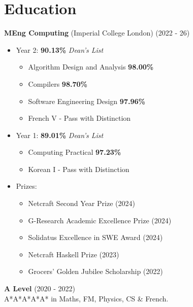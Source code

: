 \documentclass{Resume}
\begin{document}


	\section{Education}
	\textbf{MEng Computing} (Imperial College London) \hfill (2022 - 26)
 \begin{itemize}
     \item Year 2: \textbf{90.13\%} \textit{Dean's List} \begin{itemize}
         \item Algorithm Design and Analysis \textbf{98.00\%}
         \item Compilers \textbf{98.70\%}
         \item Software Engineering Design \textbf{97.96\%}
         \item French V - Pass with Distinction
     \end{itemize}
     \item Year 1: \textbf{89.01\%} \textit{Dean's List} \begin{itemize}
         \item Computing Practical \textbf{97.23\%}
         \item Korean I - Pass with Distinction
     \end{itemize}
     \item Prizes: \begin{itemize}
         \item Netcraft Second Year Prize (2024)
         \item G-Research Academic Excellence Prize (2024)
         \item Solidatus Excellence in SWE Award (2024)
         \item Netcraft Haskell Prize (2023)
         \item Grocers' Golden Jubilee Scholarship (2022)
     \end{itemize}
 \end{itemize}
		\textbf{A Level} \hfill (2020 - 2022) \\
                A*A*A*A*A* in Maths, FM, Physics, CS \& French.
            
\end{document}
